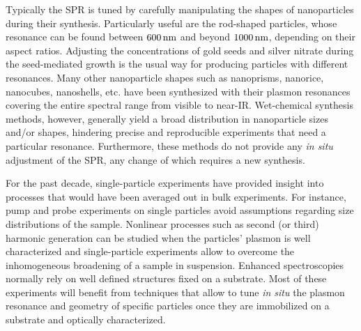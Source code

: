 Typically the SPR is tuned by carefully manipulating the shapes of nanoparticles
during their synthesis. Particularly useful are the rod-shaped particles, whose
resonance can be found between $600\,\textrm{nm}$ and beyond $1000\,\textrm{nm}$, depending on
their aspect ratios. Adjusting the concentrations of gold seeds and silver
nitrate during the seed-mediated growth\cite{Vigderman2012} is
the usual way for producing particles with different resonances. Many other
nanoparticle shapes such as nanoprisms, nanorice, nanocubes, nanoshells, etc.
have been synthesized with their plasmon resonances covering the entire spectral
range from visible to near-IR\cite{Lal2007}. Wet-chemical synthesis methods,
however, generally yield a broad distribution in nanoparticle sizes and/or
shapes, hindering precise and reproducible experiments that need a particular
resonance. Furthermore, these methods do not provide any \textit{in situ}
adjustment of the SPR, any change of which requires a new synthesis.

For the past decade, single-particle experiments have provided insight into
processes that would have been averaged out in bulk experiments.
For instance, pump and probe experiments on single particles avoid assumptions
regarding size distributions of the
sample\cite{Hartland2006,Ruijgrok2012c}. Nonlinear processes such as
second (or third) harmonic generation can be studied when the particles' plasmon is
well characterized and single-particle experiments allow to overcome the
inhomogeneous broadening of a sample in
suspension\cite{Butet2010,Lippitz2005}. Enhanced spectroscopies normally
rely on well defined structures fixed on a substrate\cite{Olk2008}.
Most of these experiments will benefit from techniques that allow to tune \textit{in
situ} the plasmon resonance and geometry of specific particles once they
are immobilized on a substrate and optically characterized.

